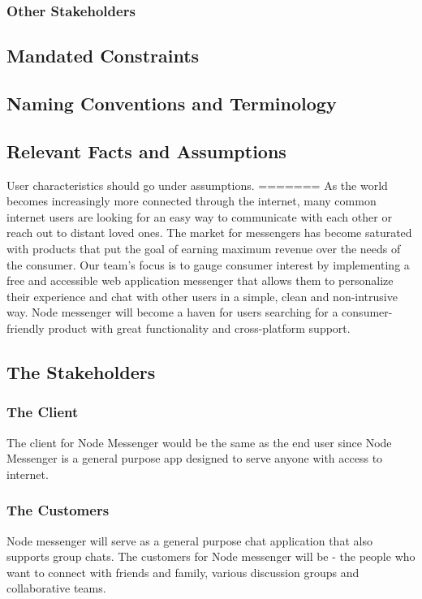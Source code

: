 \documentclass[12pt, titlepage]{article}
\begin{document}
    		\subsubsection{Other Stakeholders}

    	\subsection{Mandated Constraints}

    	\subsection{Naming Conventions and Terminology}

    	\subsection{Relevant Facts and Assumptions}

    	User characteristics should go under assumptions.
=======
        As the world becomes increasingly more connected through the internet, many common internet users are looking for an easy way to communicate with each other or reach out to distant loved ones. The market for messengers has become saturated with products that put the goal of earning maximum revenue over the needs of the consumer. Our team’s focus is to gauge consumer interest by implementing a free and accessible web application messenger that allows them to personalize their experience and chat with other users in a simple, clean and non-intrusive way. Node messenger will become a haven for users searching for a consumer-friendly product with great functionality and cross-platform support.
    	\subsection{The Stakeholders}

    		\subsubsection{The Client}
            The client for Node Messenger would be the same as the end user since Node Messenger is a general purpose app designed to serve anyone with access to internet.
    		\subsubsection{The Customers}
    		Node messenger will serve as a general purpose chat application that also supports group chats. The customers for Node messenger will be - the people who want to connect with friends and family, various discussion groups and collaborative teams.
\end{document}
